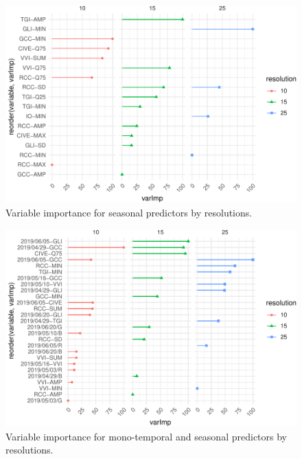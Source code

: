 \documentclass[]{article}
\begin{document}
\begin{figure}[H]

{\centering \includegraphics{report_files/figure-latex/var_imp_season-1} 

}

\caption{Variable importance for seasonal predictors by resolutions.}\label{fig:var_imp_season}
\end{figure}

\begin{figure}[H]

{\centering \includegraphics{report_files/figure-latex/var_imp_all-1} 

}

\caption{Variable importance for mono-temporal and seasonal predictors by resolutions.}\label{fig:var_imp_all}
\end{figure}
\end{document}

